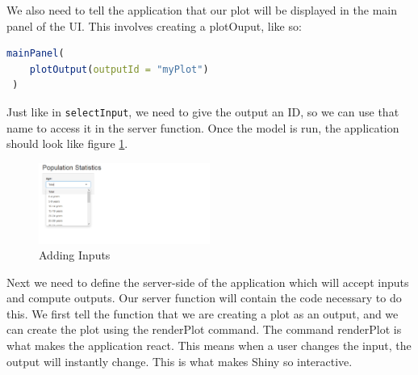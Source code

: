 We also need to tell the application that our plot will be displayed in the main panel of the UI.
This involves creating a plotOuput, like so: 
\begin{lstlisting}[language = R]
 mainPanel(
    plotOutput(outputId = "myPlot")
 )
\end{lstlisting}
Just like in \texttt{selectInput}, we need to give the output an ID, so we can use that name to access it in the server function.
Once the model is run, the application should look like figure \ref{fig:drop}. 
\begin{figure}[h]
   \centering
   \includegraphics[width=0.5\textwidth]{pictures/shiny/dropdown.PNG} 
   \caption{Adding Inputs}
   \label{fig:drop}
\end{figure}
Next we need to define the server-side of the application which will accept inputs and compute outputs.
Our server function will contain the code necessary to do this.
We first tell the function that we are creating a plot as an output, and we can create the plot using the renderPlot command.
The command renderPlot is what makes the application react.
This means when a user changes the input, the output will instantly change. This is what makes Shiny so interactive.

